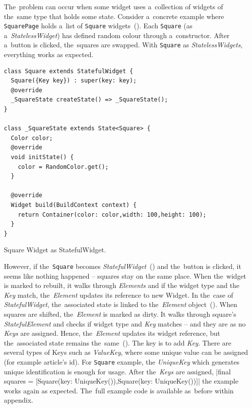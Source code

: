 The~problem can occur when some widget uses a~collection of widgets of the~same type that holds some state. Consider a~concrete example where \verb|SquarePage| holds a~list of \verb|Square| widgets~(). Each \verb|Square| (as a~\textit{StatelessWidget}) has defined random colour through a~constructor. After a~button is clicked, the~squares are swapped. With \verb|Square| as \textit{StatelessWidgets}, everything works as expected. 

\begin{listing}[ht]
\begin{verbatim}
class Square extends StatefulWidget {
  Square({Key key}) : super(key: key);
  @override
  _SquareState createState() => _SquareState();
}

class _SquareState extends State<Square> {
  Color color;
  @override
  void initState() {
    color = RandomColor.get();
  }

  @override
  Widget build(BuildContext context) {
    return Container(color: color,width: 100,height: 100);
  }
}
\end{verbatim}
\caption{Square Widget as StatefulWidget.}
\label{listing:keys_square_stateful}
\end{listing}

However, if the~\verb|Square| becomes \textit{StatefulWidget}~() and the~button is clicked, it seems like nothing happened -- squares stay on the same place. When the~widget is marked to rebuilt, it walks through \textit{Elements} and if the widget type and the \textit{Key} match, the~\textit{Element} updates its reference to new Widget. In the~case of \textit{StatefulWidget}, the~associated state is linked to the~\textit{Element} object~(). When squares are shifted, the~\textit{Element} is marked as dirty. It walks through square's \textit{StatefulElement} and checks if widget type and \textit{Key} matches -- and they are as no \textit{Keys} are assigned. Hence, the~\textit{Element} updates its widget reference, but the~associated state remains the~same~(). 
The key is to add \textit{Key}. There are several types of Keys such as \textit{ValueKey}, where some unique value can be assigned (for example article's id). For \verb|Square| example, the \textit{UniqueKey} which generates unique identification is enough for usage.  After the~\textit{Keys} are assigned, |final squares = [Square(key: UniqueKey()),Square(key: UniqueKey())]| the example works again as expected. The~full example code is available as~before within appendix.

